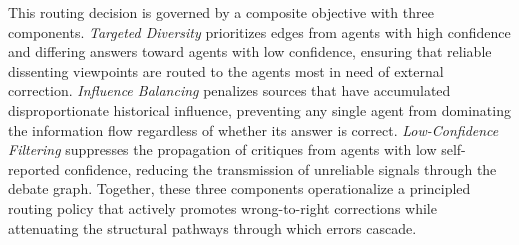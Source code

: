 This routing decision is governed by a composite objective with three components. \textit{Targeted Diversity} prioritizes edges from agents with high confidence and differing answers toward agents with low confidence, ensuring that reliable dissenting viewpoints are routed to the agents most in need of external correction. \textit{Influence Balancing} penalizes sources that have accumulated disproportionate historical influence, preventing any single agent from dominating the information flow regardless of whether its answer is correct. \textit{Low-Confidence Filtering} suppresses the propagation of critiques from agents with low self-reported confidence, reducing the transmission of unreliable signals through the debate graph. Together, these three components operationalize a principled routing policy that actively promotes wrong-to-right corrections while attenuating the structural pathways through which errors cascade. 




